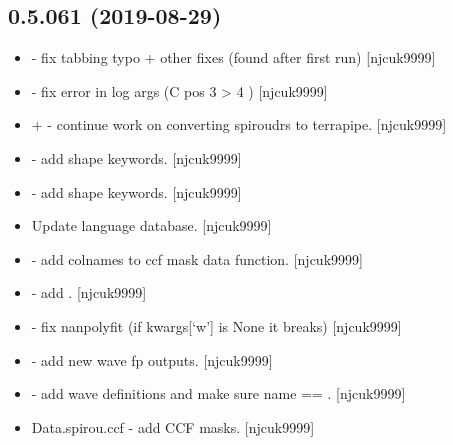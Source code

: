 \documentclass[a4paper,10pt,english]{report}
\begin{document}
\subsection{0.5.061 (2019-08-29)}
\label{\detokenize{misc/changelog:id82}}\begin{itemize}
\item {} 
 - fix tabbing typo + other fixes (found after
first run) {[}njcuk9999{]}

\item {} 
 - fix error in log args (C  pos 3 \textendash{}\textgreater{} 4 )
{[}njcuk9999{]}

\item {} 
 +  - continue work on
converting spiroudrs to terrapipe. {[}njcuk9999{]}

\item {} 
 - add shape keywords. {[}njcuk9999{]}

\item {} 
 - add shape keywords. {[}njcuk9999{]}

\item {} 
Update language database. {[}njcuk9999{]}

\item {} 
 - add colnames to ccf mask data function. {[}njcuk9999{]}

\item {} 
 - add . {[}njcuk9999{]}

\item {} 
 - fix nanpolyfit (if kwargs{[}‘w’{]} is None it
breaks) {[}njcuk9999{]}

\item {} 
 - add new wave fp
outputs. {[}njcuk9999{]}

\item {} 
 - add wave definitions and
make sure name == . {[}njcuk9999{]}

\item {} 
Data.spirou.ccf - add CCF masks. {[}njcuk9999{]}


\end{itemize}
\end{document}
